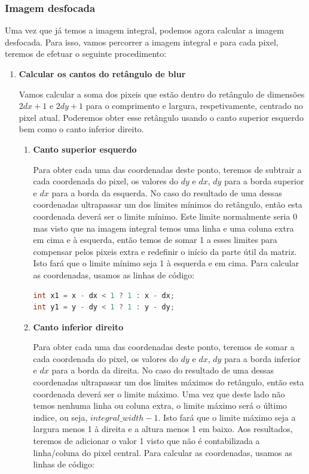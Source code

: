 \subsubsection{Imagem desfocada}

Uma vez que já temos a imagem integral, podemos agora calcular a imagem desfocada. Para isso, vamos percorrer a imagem integral e para cada pixel, teremos de efetuar o seguinte procedimento:

\begin{enumerate}

\item {
\textbf{Calcular os cantos do retângulo de blur}

Vamos calcular a soma dos pixeis que estão dentro do retângulo de dimensões $2dx+1$ e $2dy+1$ para o comprimento e largura, respetivamente, centrado no pixel atual. Poderemos obter esse retângulo usando o canto superior esquerdo bem como o canto inferior direito.

\begin{enumerate}
    

    \item {
        \textbf{Canto superior esquerdo}

        Para obter cada uma das coordenadas deste ponto, teremos de subtrair a cada coordenada do pixel, os valores do $dy$ e $dx$, $dy$ para a borda superior e $dx$ para a borda da esquerda. No caso do resultado de uma dessas coordenadas ultrapassar um dos limites mínimos do retângulo, então esta coordenada deverá ser o limite mínimo. Este limite normalmente seria 0 mas visto que na imagem integral temos uma linha e uma coluna extra em cima e à esquerda, então temos de somar 1 a esses limites para compensar pelos pixeis extra e redefinir o início da parte útil da matriz. Isto fará que o limite mínimo seja 1 à esquerda e em cima. Para calcular as coordenadas, usamos as linhas de código: 

        \begin{lstlisting}[language=C]
int x1 = x - dx < 1 ? 1 : x - dx;
int y1 = y - dy < 1 ? 1 : y - dy;
        \end{lstlisting}
    }
    \item {
        \textbf{Canto inferior direito}

        Para obter cada uma das coordenadas deste ponto, teremos de somar a cada coordenada do pixel, os valores do $dy$ e $dx$, $dy$ para a borda inferior e $dx$ para a borda da direita. No caso do resultado de uma dessas coordenadas ultrapassar um dos limites máximos do retângulo, então esta coordenada deverá ser o limite máximo. Uma vez que deste lado não temos nenhuma linha ou coluna extra, o limite máximo será o último indice, ou seja, $integral\_width-1$. Isto fará que o limite máximo seja a largura menos 1 à direita e a altura menos 1 em baixo. Aos resultados, teremos de adicionar o valor 1 visto que não é contabilizada a linha/coluna do pixel central. Para calcular as coordenadas, usamos as linhas de código:

}
\end{enumerate}}
\end{enumerate}
